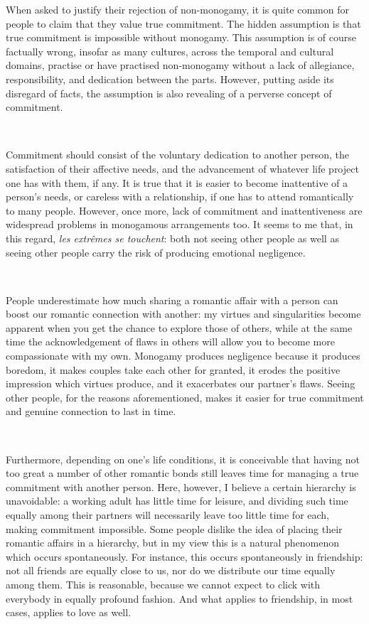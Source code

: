 \documentclass[a4paper, 12pt]{article}
\begin{document}
When asked to justify their rejection of non-monogamy, it is quite common for
people to claim that they value true commitment. The hidden assumption is that
true commitment is impossible without monogamy. This assumption is of course
factually wrong, insofar as many cultures, across the temporal and cultural
domains, practise or have practised non-monogamy without a lack of allegiance,
responsibility, and dedication between the parts. However, putting aside its
disregard of facts, the assumption is also revealing of a perverse concept of
commitment. 

~ 

Commitment should consist of the voluntary dedication to another person, the
satisfaction of their affective needs, and the advancement of whatever life
project one has with them, if any. It is true that it is easier to become 
inattentive of a person's needs, or careless with a relationship, if one has 
to attend romantically to many people. However, once more, lack of commitment 
and inattentiveness are widespread problems in monogamous arrangements too. It seems
to me that, in this regard, \textit{les extrêmes se touchent}: both not seeing other 
people as well as seeing other people carry the risk of producing emotional 
negligence. 

~

People underestimate how much sharing a romantic affair with a person can boost
our romantic connection with another: my virtues and singularities become
apparent when you get the chance to explore those of others, while at the same
time the acknowledgement of flaws in others will allow you to become more
compassionate with my own. Monogamy produces negligence because it produces
boredom, it makes couples take each other for granted, it erodes the positive
impression which virtues produce, and it exacerbates our partner's flaws.
Seeing other people, for the reasons aforementioned, makes it easier for true
commitment and genuine connection to last in time.

~ 

Furthermore, depending on one's life conditions, it is conceivable that having
not too great a number of other romantic bonds still leaves time for managing a 
true commitment with another person. Here, however, I believe a certain hierarchy 
is unavoidable: a working adult has little time for leisure, and dividing such time 
equally among their partners will necessarily leave too little time for each, making 
commitment impossible. Some people dislike the idea of placing their romantic affairs 
in a hierarchy, but in my view this is a natural phenomenon which occurs spontaneously.
For instance, this occurs spontaneously in friendship: not all friends are
equally close to us, nor do we distribute our time equally among them. This is
reasonable, because we cannot expect to click with everybody in equally
profound fashion. And what applies to friendship, in most cases, applies to
love as well.
\end{document}
